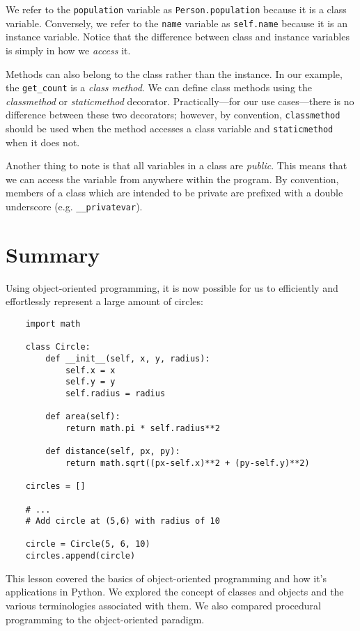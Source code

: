\documentclass{cslesson}
\begin{document}
We refer to the \texttt{population} variable as \texttt{Person.population} because it is a class variable. Conversely,
we refer to the \texttt{name} variable as \texttt{self.name} because it is an instance variable. Notice that the difference
between class and instance variables is simply in how we \textit{access} it.

Methods can also belong to the class rather than the instance. In our example, the \texttt{get\_count} is a 
\textit{class method}. We can define class methods using the \textit{classmethod} or \textit{staticmethod} 
decorator. Practically---for our use cases---there is no difference between these two decorators; however, 
by convention, \texttt{classmethod} should be used when the method accesses a class variable and \texttt{staticmethod} 
when it does not.

Another thing to note is that all variables in a class are \textit{public}. This means that we can access the variable
from anywhere within the program. By convention, members of a class which are intended to be private are prefixed
with a double underscore (e.g. \texttt{\_\_privatevar}).

\section{Summary}
Using object-oriented programming, it is now possible for us to efficiently and effortlessly represent a large amount of circles:
\begin{verbatim}
    import math

    class Circle:
        def __init__(self, x, y, radius):
            self.x = x
            self.y = y
            self.radius = radius

        def area(self):
            return math.pi * self.radius**2

        def distance(self, px, py):
            return math.sqrt((px-self.x)**2 + (py-self.y)**2)

    circles = []

    # ...
    # Add circle at (5,6) with radius of 10

    circle = Circle(5, 6, 10)
    circles.append(circle)
\end{verbatim}

This lesson covered the basics of object-oriented programming and how it's applications in Python. We explored the concept of classes and objects
and the various terminologies associated with them. We also compared procedural programming to the object-oriented paradigm. 
\end{document}
